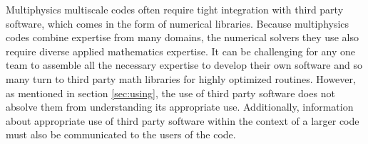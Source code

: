 


Multiphysics multiscale codes often require tight integration with third party software, which comes
in the form of numerical libraries. Because multiphysics codes combine
expertise from many domains, the numerical solvers they use also
require diverse applied mathematics expertise. It can be challenging 
for any one team to assemble all the necessary expertise to develop their own software and so many turn to third party math libraries for highly optimized routines.  However, as mentioned in section \ref{sec:using}, the use of
third party software does not absolve them from understanding its appropriate
use.  Additionally, information about appropriate use of third party
software within the context of a larger code must also be communicated
to the users of the code. 




